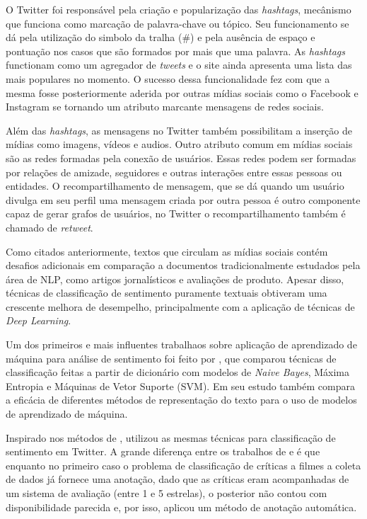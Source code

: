 O Twitter foi responsável pela criação e popularização das \textit{hashtags},
mecânismo que funciona como marcação de palavra-chave ou tópico.
Seu funcionamento se dá pela utilização do simbolo da tralha (\#) e pela ausência
de espaço e pontuação nos casos que são formados por mais que uma palavra.
As \textit{hashtags} functionam como um agregador de \textit{tweets} e o site
ainda apresenta uma lista das mais populares no momento.
O sucesso dessa funcionalidade fez com que a mesma fosse posteriormente aderida
por outras mídias sociais como o Facebook e Instagram se tornando um
atributo marcante mensagens de redes sociais.

Além das \textit{hashtags}, as mensagens no Twitter também possibilitam a
inserção de mídias como imagens, vídeos e audios.
Outro atributo comum em mídias sociais são as redes formadas pela conexão de
usuários.
Essas redes podem ser formadas por relações de amizade, seguidores e outras
interações entre essas pessoas ou entidades.
O recompartilhamento de mensagem, que se dá quando um usuário divulga em seu
perfil uma mensagem criada por outra pessoa é outro componente capaz de gerar
grafos de usuários, no Twitter o recompartilhamento também é chamado de
\textit{retweet}.

Como citados anteriormente, textos que circulam as mídias sociais contém
desafios adicionais em comparação a documentos tradicionalmente estudados pela
área de NLP, como artigos jornalísticos e avaliações de produto.
Apesar disso, técnicas de classificação de sentimento puramente textuais
obtiveram uma crescente melhora de desempelho, principalmente com a aplicação de
técnicas de \textit{Deep Learning}.

Um dos primeiros e mais influentes trabalhaos sobre aplicação de aprendizado de
máquina para análise de sentimento foi feito por \citet{pang02}, que comparou
técnicas de classificação feitas a partir de dicionário com modelos de
\textit{Naive Bayes}, Máxima Entropia e Máquinas de Vetor Suporte (SVM).
Em seu estudo \citet{pang02} também compara a eficácia de diferentes métodos de
representação do texto para o uso de modelos de aprendizado de máquina.

Inspirado nos métodos de \citet{pang02}, \citet{go09} utilizou as mesmas
técnicas para classificação de sentimento em Twitter.
A grande diferença entre os trabalhos de \citet{pang02} e \citet{go09} é que
enquanto no primeiro caso o problema de classificação de críticas a filmes
a coleta de dados já fornece uma anotação, dado que as críticas eram
acompanhadas de um sistema de avaliação (entre 1 e 5 estrelas), o posterior
não contou com disponibilidade parecida e, por isso, aplicou um método de
anotação automática.

